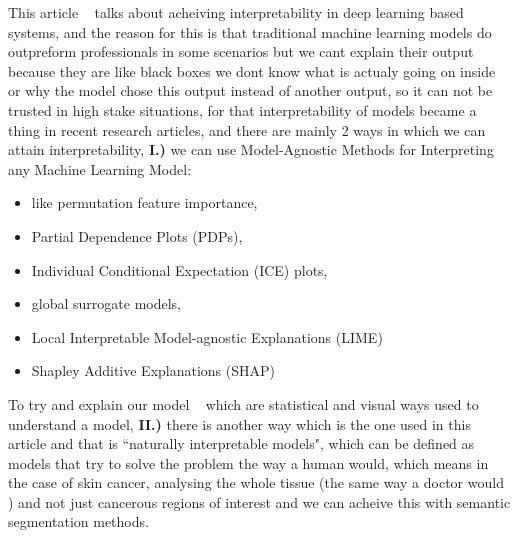 This article ~\cite{Thomas2021} talks about acheiving interpretability in deep learning based systems, and the reason for this is that traditional machine learning models do outpreform professionals in some scenarios but we cant explain their output because they are like black boxes we dont know what is actualy going on inside or why the model chose this output instead of another output, so it can not be trusted in high stake situations, for that interpretability of models became a thing in recent research articles, and there are mainly 2 ways in which we can attain interpretability, \textbf{I.)} we can use Model-Agnostic Methods for Interpreting any Machine Learning Model:
\begin{itemize}
    \item like permutation feature importance, 
    \item Partial Dependence Plots (PDPs), 
    \item Individual Conditional Expectation (ICE) plots, 
    \item global surrogate models, 
    \item Local Interpretable Model-agnostic Explanations (LIME) 
    \item Shapley Additive Explanations (SHAP) 
\end{itemize}
To try and explain our model ~\cite{Hennie2020} which are statistical and visual ways used to understand a model, \textbf{II.)} there is another way which is the one used in this article and that is ``naturally interpretable models", which can be defined as models that try to solve the problem the way a human would, which means in the case of skin cancer, analysing the whole tissue (the same way a doctor would ) and not just cancerous regions of interest and we can acheive this with semantic segmentation methods.

